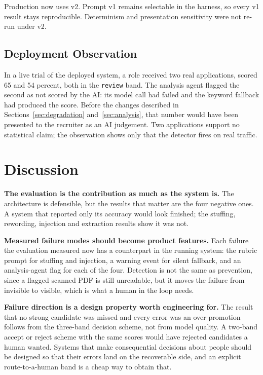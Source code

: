 \documentclass[conference]{IEEEtran}
\begin{document}
Production now uses v2. Prompt v1 remains selectable in the harness, so every
v1 result stays reproducible. Determinism and presentation sensitivity were not
re-run under v2.

\subsection{Deployment Observation}

In a live trial of the deployed system, a role received two real applications,
scored 65 and 54 percent, both in the \texttt{review} band. The analysis agent
flagged the second as not scored by the AI: its model call had failed and the
keyword fallback had produced the score. Before the changes described in
Sections~\ref{sec:degradation} and~\ref{sec:analysis}, that number would have
been presented to the recruiter as an AI judgement. Two applications support no
statistical claim; the observation shows only that the detector fires on real
traffic.

\section{Discussion}

\textbf{The evaluation is the contribution as much as the system is.} The
architecture is defensible, but the results that matter are the four negative
ones. A system that reported only its accuracy would look finished; the
stuffing, rewording, injection and extraction results show it was not.

\textbf{Measured failure modes should become product features.} Each failure the
evaluation measured now has a counterpart in the running system: the rubric
prompt for stuffing and injection, a warning event for silent fallback, and an
analysis-agent flag for each of the four. Detection is not the same as
prevention, since a flagged scanned PDF is still unreadable, but it moves the
failure from invisible to visible, which is what a human in the loop needs.

\textbf{Failure direction is a design property worth engineering for.} The
result that no strong candidate was missed and every error was an
over-promotion follows from the three-band decision scheme, not from model
quality. A two-band accept or reject scheme with the same scores would have
rejected candidates a human wanted. Systems that make consequential decisions
about people should be designed so that their errors land on the recoverable
side, and an explicit route-to-a-human band is a cheap way to obtain that.
\end{document}
